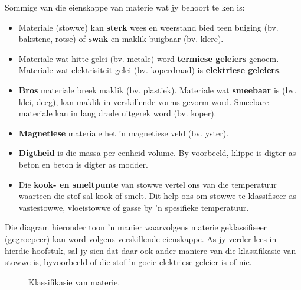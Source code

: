 \label{m38708*id0132}Sommige van die eienskappe van materie wat jy behoort te ken is:
\label{m38708*lid825}\begin{itemize}[noitemsep]
  \item Materiale (stowwe) kan \textbf{sterk} wees en weerstand bied teen buiging (bv. bakstene, rotse) of \textbf{swak} en maklik buigbaar (bv. klere).
  \item Materiale wat hitte gelei (bv. metale) word \textbf{termiese geleiers} genoem. Materiale wat elektrisiteit gelei (bv. koperdraad) is \textbf{elektriese geleiers}.
  \item \textbf{Bros} materiale breek maklik (bv. plastiek). Materiale wat \textbf{smeebaar} is (bv. klei, deeg), kan maklik in verskillende vorms gevorm word. Smeebare materiale kan in lang drade uitgerek word (bv. koper).
  \item \textbf{Magnetiese} materiale het 'n magnetiese veld (bv. yster).
  \item \textbf{Digtheid} is die massa per eenheid volume. By voorbeeld, klippe is digter as beton en beton is digter as modder.
  \item Die \textbf{kook- en smeltpunte} van stowwe vertel ons van die temperatuur waarteen die stof sal kook of smelt. Dit help ons om stowwe te klassifiseer as vastestowwe, vloeistowwe of gasse by 'n spesifieke temperatuur.\end{itemize}
\par 

      \label{m38708*id62556}Die diagram hieronder toon 'n manier waarvolgens materie geklassifiseer (gegroepeer) kan word volgens verskillende eienskappe. As jy verder lees in hierdie hoofstuk, sal jy sien dat daar ook ander maniere van die klassifikasie van stowwe is, byvoorbeeld of die stof 'n goeie elektriese geleier is of nie.\par 
    \setcounter{subfigure}{0}
	\begin{figure}[H] %
    \begin{center}
    \end{center}
\caption{Klassifikasie van materie.}
\label{fig:c:ClassificationOfMatter}
 \end{figure}      


